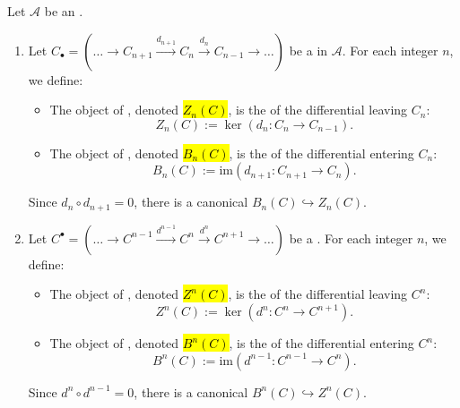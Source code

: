\begin{definition} \label{definition:boundary_cycle_coboundary_cocyble_of_a_chain_cochain_complex}
    Let $\mathcal{A}$ be an .
    \begin{enumerate}
        \item Let $C_\bullet = (\dots \to C_{n+1} \xrightarrow{d_{n+1}} C_n \xrightarrow{d_n} C_{n-1} \to \dots)$ be a  in $\mathcal{A}$.
        For each integer $n$, we define:
        \begin{itemize}
            \item The object of , denoted \hl{$Z_n(C)$}, is the  of the differential leaving $C_n$:
            $$Z_n(C) := \ker(d_n: C_n \to C_{n-1}).$$
            \item The object of , denoted \hl{$B_n(C)$}, is the  of the differential entering $C_n$:
            $$B_n(C) := \text{im}(d_{n+1}: C_{n+1} \to C_n).$$
        \end{itemize}
        Since $d_n \circ d_{n+1} = 0$, there is a canonical  $B_n(C) \hookrightarrow Z_n(C)$.

        \item Let $C^\bullet = (\dots \to C^{n-1} \xrightarrow{d^{n-1}} C^n \xrightarrow{d^n} C^{n+1} \to \dots)$ be a .
        For each integer $n$, we define:
        \begin{itemize}
            \item The object of , denoted \hl{$Z^n(C)$}, is the  of the differential leaving $C^n$:
            $$Z^n(C) := \ker(d^n: C^n \to C^{n+1}).$$
            \item The object of , denoted \hl{$B^n(C)$}, is the  of the differential entering $C^n$:
            $$B^n(C) := \text{im}(d^{n-1}: C^{n-1} \to C^n).$$
        \end{itemize}
        Since $d^n \circ d^{n-1} = 0$, there is a canonical  $B^n(C) \hookrightarrow Z^n(C)$.
    \end{enumerate}
\end{definition}